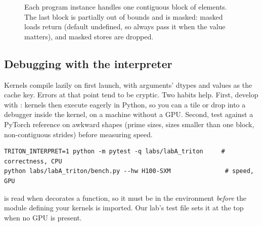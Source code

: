 \begin{figure}[t]
\centering
{}
\caption{Each program instance handles one contiguous block of  elements.
The last block is partially out of bounds and is masked: masked loads return
 (default undefined, so always pass it when the value matters), and masked
stores are dropped.}
\label{fig:triton:add}
\end{figure}

\subsection{Debugging with the interpreter}
Kernels compile lazily on first launch, with arguments' dtypes and 
values as the cache key. Errors at that point tend to be cryptic. Two habits help.
First, develop with : kernels then execute eagerly in Python,
so you can  a tile or drop into a debugger inside the kernel, on a machine
without a GPU. Second, test against a PyTorch reference on awkward shapes (prime sizes,
sizes smaller than one block, non-contiguous strides) before measuring speed.

\begin{lstlisting}[style=shell]
TRITON_INTERPRET=1 python -m pytest -q labs/labA_triton     # correctness, CPU
python labs/labA_triton/bench.py --hw H100-SXM               # speed, GPU
\end{lstlisting}

\begin{pitfall}
 is read when  decorates a function, so it must
be in the environment \emph{before} the module defining your kernels is imported. Our
lab's test file sets it at the top when no GPU is present.
\end{pitfall}


